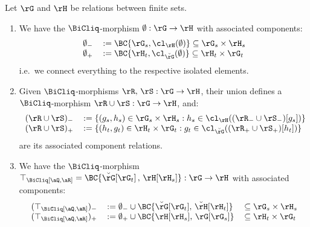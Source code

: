 \documentclass{article}
\begin{document}
\begin{lemma}
\label{lem:bicliq_mor_jsl_struct}
Let $\rG$ and $\rH$ be relations between finite sets.
\begin{enumerate}
\item
We have the $\BiCliq$-morphism $\emptyset : \rG \to \rH$ with associated components:
\[
\begin{tabular}{lll}
$\emptyset_-$ & $:= \BC{\rG_s,\cl_\rH(\emptyset)} \subseteq \rG_s \times \rH_s$
\\
$\emptyset_+$ & $:= \BC{\rH_t,\cl_{\breve{\rG}}(\emptyset)} \subseteq \rH_t \times \rG_t$
\end{tabular}
\]
i.e.\ we connect everything to the respective isolated elements.

\item
Given $\BiCliq$-morphisms $\rR,\,\rS : \rG \to \rH$, their union defines a $\BiCliq$-morphism $\rR \cup \rS : \rG \to \rH$, and:
\[
\begin{tabular}{lll}
$(\rR \cup \rS)_-$ & $:= \{ (g_s,h_s) \in \rG_s \times \rH_s : h_s \in \cl_\rH((\rR_- \cup \rS_-)[g_s]) \}$
\\
$(\rR \cup \rS)_+$ & $:= \{ (h_t,g_t) \in \rH_t \times \rG_t : g_t \in \cl_{\breve{\rG}}((\rR_+ \cup \rS_+)[h_t]) \}$
\end{tabular}
\]
are its associated component relations.

\item
We have the $\BiCliq$-morphism $\top_{\BiCliq[\aQ,\aR]} = \BC{\breve{\rG}[\rG_t]\,,\, \rH[\rH_s]} : \rG \to \rH$ with associated components:
\[
\begin{tabular}{lll}
$(\top_{\BiCliq[\aQ,\aR]})_-$ & $:= \emptyset_- \cup \BC{\breve{\rG}[\rG_t],\,\breve{\rH}[\rH_t]}$ & $\subseteq \rG_s \times \rH_s$
\\
$(\top_{\BiCliq[\aQ,\aR]})_+$ & $:= \emptyset_+ \cup \BC{\rH[\rH_s],\,\rG[\rG_s]}$ & $\subseteq \rH_t \times \rG_t$
\end{tabular}
\]

\end{enumerate}
\end{lemma}
\end{document}
